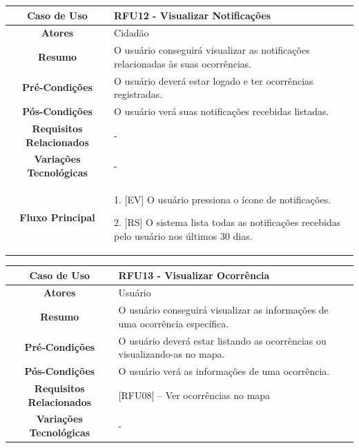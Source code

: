 \begin{apendicesenv}
\begin{quadro}[htb]
	\begin{tabular}{|c|p{11cm}|}
		\hline
		\textbf{Caso de Uso} & RFU12 - Visualizar Notificações \\ \hline
		\textbf{Atores} & Cidadão \\ \hline
		\textbf{Resumo} & O usuário conseguirá visualizar as notificações relacionadas às suas ocorrências. \\ \hline
		\textbf{Pré-Condições} & O usuário deverá estar logado e ter ocorrências registradas. \\ \hline
		\textbf{Pós-Condições} & O usuário verá suas notificações recebidas listadas. \\ \hline
		\textbf{Requisitos Relacionados} & - \\ \hline
		\textbf{Variações Tecnológicas} & - \\ \hline
		
		\textbf{Fluxo Principal} &
		\parbox[t]{11cm}{
			\raggedright
			1. [EV] O usuário pressiona o ícone de notificações.\par
			2. [RS] O sistema lista todas as notificações recebidas pelo usuário nos últimos 30 dias.
		}
		\\ \hline
		
		\textbf{Tratamento de Exceções} &
		\parbox[t]{11cm}{
			\raggedright
			--
		}
		\\ \hline
	\end{tabular}
	
\end{quadro}

\begin{quadro}[htb]
	\centering
	\caption{\label{quadro_rfu13}Caso de Uso Visualizar Ocorrência (Baixo Nível)}
	\small
	\renewcommand{\arraystretch}{1.1}
	
	\begin{tabular}{|c|p{11cm}|}
		\hline
		\textbf{Caso de Uso} & RFU13 - Visualizar Ocorrência \\ \hline
		\textbf{Atores} & Usuário \\ \hline
		\textbf{Resumo} & O usuário conseguirá visualizar as informações de uma ocorrência específica. \\ \hline
		\textbf{Pré-Condições} & O usuário deverá estar listando as ocorrências ou visualizando-as no mapa. \\ \hline
		\textbf{Pós-Condições} & O usuário verá as informações de uma ocorrência. \\ \hline
		\textbf{Requisitos Relacionados} & [RFU08] -- Ver ocorrências no mapa \\ \hline
		\textbf{Variações Tecnológicas} & - \\ \hline
		

\end{tabular}
\end{quadro}
\end{apendicesenv}

